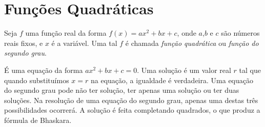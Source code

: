 \section{Funções Quadráticas}

Seja $f$ uma função real  da forma $f(x)=ax^2+bx+c$, onde $a$,$b$ e $c$ são números reais fixos, e $x$ é a variável. Uma tal $f$ é chamada {\it função quadrática} ou
{\it função do segundo grau}.

\vspace{0.5cm}

 É uma equação da forma $ax^2+bx+c=0$. Uma solução é um valor real $r$ tal que quando substituímos $x=r$ na equação, a igualdade é verdadeira. Uma equação
do segundo grau pode não ter solução, ter apenas uma solução ou ter duas soluções. Na resolução de uma equação do segundo grau, apenas uma destas três possibilidades ocorrerá. A solução é feita completando quadrados,
o que produz a fórmula de Bhaskara.



